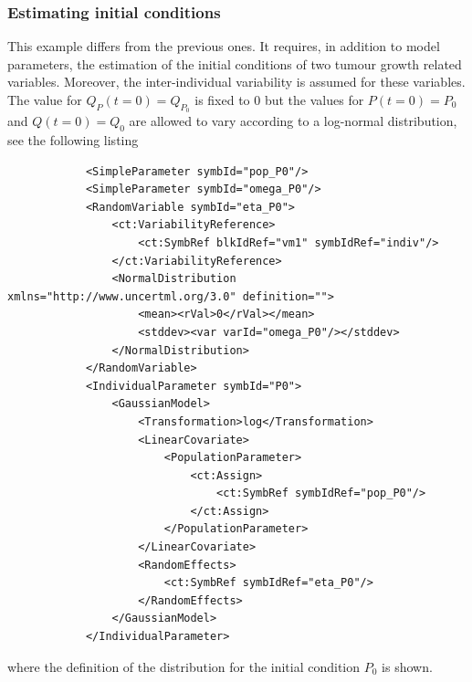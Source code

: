 \subsubsection{Estimating initial conditions}
This example differs from the previous ones. It requires, in addition to model parameters, 
the estimation of the initial conditions of two tumour growth related variables. 
Moreover, the inter-individual variability is assumed for these variables.
The value for $Q_P(t=0)=Q_{P_0}$ is fixed to $0$ but the values for $P(t=0)=P_0$ and $Q(t=0)=Q_0$
are allowed to vary according to a log-normal distribution, see the following listing 
\lstset{language=XML}
\begin{lstlisting}
            <SimpleParameter symbId="pop_P0"/>
            <SimpleParameter symbId="omega_P0"/>
            <RandomVariable symbId="eta_P0">
                <ct:VariabilityReference>
                    <ct:SymbRef blkIdRef="vm1" symbIdRef="indiv"/>
                </ct:VariabilityReference>
                <NormalDistribution xmlns="http://www.uncertml.org/3.0" definition="">
                    <mean><rVal>0</rVal></mean>
                    <stddev><var varId="omega_P0"/></stddev>
                </NormalDistribution>
            </RandomVariable>
            <IndividualParameter symbId="P0">
                <GaussianModel>
                    <Transformation>log</Transformation>
                    <LinearCovariate>
                        <PopulationParameter>
                            <ct:Assign>
                                <ct:SymbRef symbIdRef="pop_P0"/>
                            </ct:Assign>
                        </PopulationParameter>
                    </LinearCovariate>
                    <RandomEffects>
                        <ct:SymbRef symbIdRef="eta_P0"/>
                    </RandomEffects>
                </GaussianModel>
            </IndividualParameter>            
\end{lstlisting}

where the definition of the distribution for the 
initial condition $P_0$ is shown.


